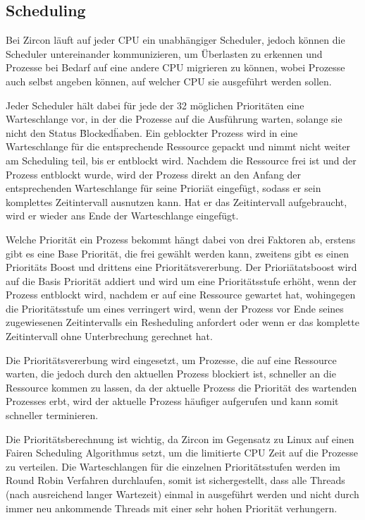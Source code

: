 \documentclass[a4paper]{scrartcl}
\begin{document}
\subsection{Scheduling}
Bei Zircon läuft auf jeder CPU ein unabhängiger Scheduler, jedoch können die Scheduler untereinander kommunizieren, um Überlasten zu erkennen und Prozesse bei Bedarf auf eine andere CPU migrieren zu können, wobei Prozesse auch selbst angeben können, auf welcher CPU sie ausgeführt werden sollen.

Jeder Scheduler hält dabei für jede der 32 möglichen Prioritäten eine Warteschlange vor, in der die Prozesse auf die Ausführung warten, solange sie nicht den Status \"Blocked\" haben. Ein geblockter Prozess wird in eine Warteschlange für die entsprechende Ressource gepackt und nimmt nicht weiter am Scheduling teil, bis er entblockt wird. Nachdem die Ressource frei ist und der Prozess entblockt wurde, wird der Prozess direkt an den Anfang der entsprechenden Warteschlange für seine Prioriät eingefügt, sodass er sein komplettes Zeitintervall ausnutzen kann. Hat er das Zeitintervall aufgebraucht, wird er wieder ans Ende der Warteschlange eingefügt.

Welche Priorität ein Prozess bekommt hängt dabei von drei Faktoren ab, erstens gibt es eine Base Priorität, die frei gewählt werden kann, zweitens gibt es einen Prioritäts Boost und drittens eine Prioritätsvererbung.
Der Prioriätatsboost wird auf die Basis Priorität addiert und wird um eine Prioritätsstufe erhöht, wenn der Prozess entblockt wird, nachdem er auf eine Ressource gewartet hat, wohingegen die Prioritätsstufe um eines verringert wird, wenn der Prozess vor Ende seines zugewiesenen Zeitintervalls ein Resheduling anfordert oder wenn er das komplette Zeitintervall ohne Unterbrechung gerechnet hat.

Die Prioritätsvererbung wird eingesetzt, um Prozesse, die auf eine Ressource warten, die jedoch durch den aktuellen Prozess blockiert ist, schneller an die Ressource kommen zu lassen, da der aktuelle Prozess die Priorität des wartenden Prozesses erbt, wird der aktuelle Prozess häufiger aufgerufen und kann somit schneller terminieren.

Die Prioritätsberechnung ist wichtig, da Zircon im Gegensatz zu Linux auf einen Fairen Scheduling Algorithmus setzt, um die limitierte CPU Zeit auf die Prozesse zu verteilen. Die Warteschlangen für die einzelnen Prioritätsstufen werden im Round Robin Verfahren durchlaufen, somit ist sichergestellt, dass alle Threads (nach ausreichend langer Wartezeit) einmal in ausgeführt werden und nicht durch immer neu ankommende Threads mit einer sehr hohen Priorität verhungern.
\end{document}
